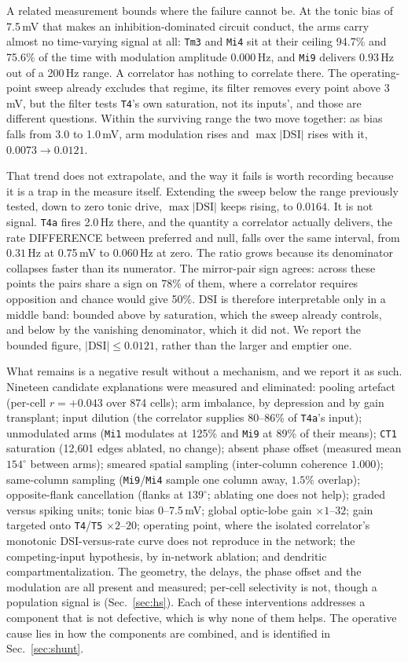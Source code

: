 \documentclass[10pt,twoside]{article}
\newcommand{\cell}[1]{\texttt{#1}}
\begin{document}
A related measurement bounds where the failure cannot be. At the tonic bias of
7.5\,mV that makes an inhibition-dominated circuit conduct, the arms carry
almost no time-varying signal at all: \cell{Tm3} and \cell{Mi4} sit at their
ceiling 94.7\% and 75.6\% of the time with modulation amplitude $0.000$\,Hz,
and \cell{Mi9} delivers $0.93$\,Hz out of a 200\,Hz range. A correlator has
nothing to correlate there. The operating-point sweep already excludes that
regime, its filter removes every point above 3\,mV, but the filter tests
\cell{T4}'s own saturation, not its inputs', and those are different
questions. Within the surviving range the two move together: as bias falls
from 3.0 to 1.0\,mV, arm modulation rises and $\max|\mathrm{DSI}|$ rises with
it, $0.0073\to0.0121$.

That trend does not extrapolate, and the way it fails is worth recording
because it is a trap in the measure itself. Extending the sweep below the
range previously tested, down to zero tonic drive, $\max|\mathrm{DSI}|$ keeps
rising, to $0.0164$. It is not signal. \cell{T4a} fires 2.0\,Hz there, and
the quantity a correlator actually delivers, the rate DIFFERENCE between
preferred and null, falls over the same interval, from $0.31$\,Hz at
0.75\,mV to $0.060$\,Hz at zero. The ratio grows because its denominator
collapses faster than its numerator. The mirror-pair sign agrees: across
these points the pairs share a sign on 78\% of them, where a correlator
requires opposition and chance would give 50\%. $\mathrm{DSI}$ is therefore
interpretable only in a middle band: bounded above by saturation, which the
sweep already controls, and below by the vanishing denominator, which it did
not. We report the bounded figure, $|\mathrm{DSI}|\leq0.0121$, rather than the
larger and emptier one.

What remains is a negative result without a mechanism, and we report it as
such. Nineteen candidate explanations were measured and eliminated: pooling
artefact (per-cell $r=+0.043$ over 874 cells); arm imbalance, by depression and
by gain transplant; input dilution (the correlator supplies 80--86\% of
\cell{T4a}'s input); unmodulated arms (\cell{Mi1} modulates at 125\% and
\cell{Mi9} at 89\% of their means); \cell{CT1} saturation (12{,}601 edges
ablated, no change); absent phase offset (measured mean $154^\circ$ between
arms); smeared spatial sampling (inter-column coherence $1.000$); same-column
sampling (\cell{Mi9}/\cell{Mi4} sample one column away, $1.5\%$ overlap);
opposite-flank cancellation (flanks at $139^\circ$; ablating one does not
help); graded versus spiking units; tonic bias 0--7.5\,mV; global optic-lobe
gain $\times1$--$32$; gain targeted onto \cell{T4}/\cell{T5} $\times2$--$20$;
operating point, where the isolated correlator's monotonic
DSI-versus-rate curve does not reproduce in the network; the competing-input
hypothesis, by in-network ablation; and dendritic compartmentalization. The geometry, the
delays, the phase offset and the modulation are all present and measured;
per-cell selectivity is not, though a population signal is
(Sec.~\ref{sec:hs}). Each of these interventions addresses a component that is
not defective, which is why none of them helps. The operative cause lies in how
the components are combined, and is identified in Sec.~\ref{sec:shunt}.
\end{document}
